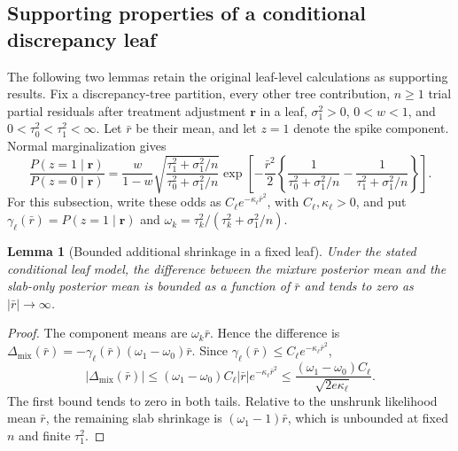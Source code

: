 \documentclass[11pt]{article}
\newtheorem{lemma}{Lemma}[section]
\theoremstyle{remark}\newtheorem{remark}{Remark}[section]
\providecommand{\DIFaddtex}[1]{{\protect\color{blue} \sf #1}} %
\providecommand{\DIFaddbegin}{} %
\providecommand{\DIFaddend}{} %
\providecommand{\DIFadd}[1]{\texorpdfstring{\DIFaddtex{#1}}{#1}} %
\begin{document}
\subsection{Supporting properties of a conditional discrepancy leaf}\label{sec:C.5}
The following two lemmas retain the original leaf-level calculations as supporting results. Fix a discrepancy-tree partition, every other tree contribution, $n\geq1$  \DIFaddbegin \DIFadd{trial partial residuals after treatment adjustment }\DIFaddend $\mathbf r$ in a leaf, $\sigma_1^2>0$, $0<w<1$, and $0<\tau_0^2<\tau_1^2<\infty$. Let $\bar r$ be their mean, and let $z=1$ denote the spike component. Normal marginalization gives
\begin{equation}\label{eq:odds}
\frac{P(z=1\mid\mathbf r)}{P(z=0\mid\mathbf r)}
=\frac{w}{1-w}\sqrt{\frac{\tau_1^2+\sigma_1^2/n}{\tau_0^2+\sigma_1^2/n}}
\exp\left[-\frac{\bar r^2}{2}
\left\{\frac{1}{\tau_0^2+\sigma_1^2/n}-\frac{1}{\tau_1^2+\sigma_1^2/n}\right\}\right].
\end{equation}
For this subsection, write these odds as $C_{\ell}e^{-\kappa_{\ell}\bar r^2}$, with $C_{\ell},\kappa_{\ell}>0$, and put $\gamma_{\ell}(\bar r)=P(z=1\mid\mathbf r)$ and $\omega_k=\tau_k^2/(\tau_k^2+\sigma_1^2/n)$.

\begin{lemma}[Bounded additional shrinkage in a fixed leaf]\label{lem:leaf_shrinkage}
Under the stated conditional leaf model, the difference between the mixture posterior mean and the slab-only posterior mean is bounded as a function of $\bar r$ and tends to zero as $|\bar r|\to\infty$.
\end{lemma}
\begin{proof}
The component means are $\omega_k\bar r$. Hence the difference is $\Delta_{\mathrm{mix}}(\bar r)=-\gamma_{\ell}(\bar r)(\omega_1-\omega_0)\bar r$. Since $\gamma_{\ell}(\bar r)\leq C_{\ell}e^{-\kappa_{\ell}\bar r^2}$,
\[
|\Delta_{\mathrm{mix}}(\bar r)|\leq(\omega_1-\omega_0)C_{\ell}|\bar r|e^{-\kappa_{\ell}\bar r^2}
\leq\frac{(\omega_1-\omega_0)C_{\ell}}{\sqrt{2e\kappa_{\ell}}}.
\]
The first bound tends to zero in both tails. Relative to the unshrunk likelihood mean $\bar r$, the remaining slab shrinkage is $(\omega_1-1)\bar r$, which is unbounded at fixed $n$ and finite $\tau_1^2$.
\end{proof}
\end{document}
